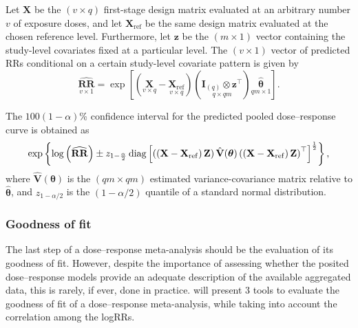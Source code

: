 Let $\mathbf{X}$ be the $(v \times q)$ first-stage design matrix evaluated at an arbitrary number $v$ of exposure doses, and let $\mathbf{X}_{\mathrm{ref}}$ be the same design matrix evaluated at the chosen reference level. Furthermore, let $\mathbf{z}$ be the $(m \times 1)$ vector containing the study-level covariates fixed at a particular level. The $(v \times 1)$ vector of predicted RRs conditional on a certain study-level covariate pattern is given by
\begin{equation*}
\underset{v\times 1}{\widehat{\mathbf{RR}}} = \exp \left[ \left(\underset{v\times q}{\mathbf{X}} - \underset{v\times q}{\mathbf{X}_{\mathrm{ref}}} \right) \left( \underset{q\times qm}{\mathbf{I}_{(q)} \otimes \mathbf{z}^\top} \right) \underset{qm \times 1}{\hat{\boldsymbol{\theta}}} \right].
\end{equation*}

The $100(1-\alpha)$\% confidence interval for the predicted pooled dose--response curve is obtained as
\begin{equation*}
\exp \left\{ \log\left( \widehat{\mathbf{RR}} \right) \pm z_{1-\frac{\alpha}{2}} \operatorname{diag} \left[ \left(\left(\mathbf{X} - \mathbf{X}_{\mathrm{ref}} \right) \mathbf{Z}\right) \hat{\mathbf{V}}(\boldsymbol{\theta}) \left(\left(\mathbf{X} - \mathbf{X}_{\mathrm{ref}} \right) \mathbf{Z}\right)^\top \right]^{\frac{1}{2}} \right\}, 
\end{equation*}
where $\hat{\mathbf{V}}(\boldsymbol{\theta})$ is the $(qm \times qm)$ estimated variance-covariance matrix relative to ${\hat{\boldsymbol{\theta}}}$, and $z_{1-\alpha/2}$ is the $(1-\alpha/2)$ quantile of a standard normal distribution.


\subsubsection{Goodness of fit}

The last step of a dose--response meta-analysis should be the evaluation of its goodness of fit. However, despite the importance of assessing whether the posited dose--response models provide an adequate description of the available aggregated data, this is rarely, if ever, done in practice.  will present 3 tools to evaluate the goodness of fit of a dose--response meta-analysis, while taking into account the correlation among the logRRs. 



